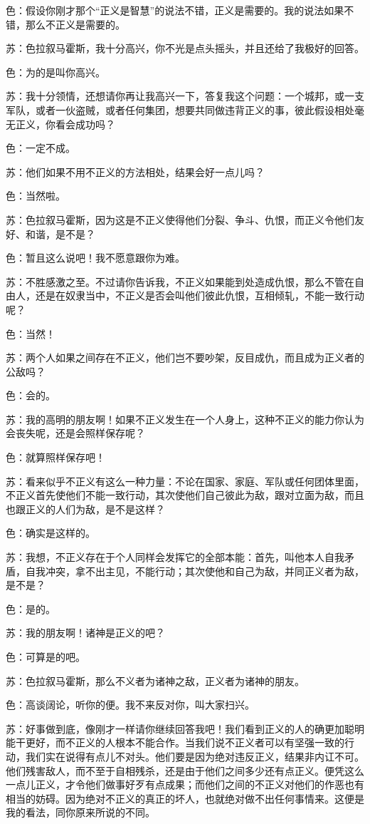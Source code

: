 \documentclass[11pt,oneside]{book}
\begin{document}
\begin{common-format}
色：假设你刚才那个“正义是智慧”的说法不错，正义是需要的。我的说法如果不错，那么不正义是需要的。

苏：色拉叙马霍斯，我十分高兴，你不光是点头摇头，并且还给了我极好的回答。

色：为的是叫你高兴。

苏：我十分领情，还想请你再让我高兴一下，答复我这个问题：一个城邦，或一支军队，或者一伙盗贼，或者任何集团，想要共同做违背正义的事，彼此假设相处毫无正义，你看会成功吗？

色：一定不成。

苏：他们如果不用不正义的方法相处，结果会好一点儿吗？

色：当然啦。

苏：色拉叙马霍斯，因为这是不正义使得他们分裂、争斗、仇恨，而正义令他们友好、和谐，是不是？

色：暂且这么说吧！我不愿意跟你为难。

苏：不胜感激之至。不过请你告诉我，不正义如果能到处造成仇恨，那么不管在自由人，还是在奴隶当中，不正义是否会叫他们彼此仇恨，互相倾轧，不能一致行动呢？

色：当然！

苏：两个人如果之间存在不正义，他们岂不要吵架，反目成仇，而且成为正义者的公敌吗？

色：会的。

苏：我的高明的朋友啊！如果不正义发生在一个人身上，这种不正义的能力你认为会丧失呢，还是会照样保存呢？

色：就算照样保存吧！

苏：看来似乎不正义有这么一种力量：不论在国家、家庭、军队或任何团体里面，不正义首先使他们不能一致行动，其次使他们自己彼此为敌，跟对立面为敌，而且也跟正义的人们为敌，是不是这样？

色：确实是这样的。

苏：我想，不正义存在于个人同样会发挥它的全部本能：首先，叫他本人自我矛盾，自我冲突，拿不出主见，不能行动；其次使他和自己为敌，并同正义者为敌，是不是？

色：是的。

苏：我的朋友啊！诸神是正义的吧？

色：可算是的吧。

苏：色拉叙马霍斯，那么不义者为诸神之敌，正义者为诸神的朋友。

色：高谈阔论，听你的便。我不来反对你，叫大家扫兴。

苏：好事做到底，像刚才一样请你继续回答我吧！我们看到正义的人的确更加聪明能干更好，而不正义的人根本不能合作。当我们说不正义者可以有坚强一致的行动，我们实在说得有点儿不对头。他们要是因为绝对违反正义，结果非内讧不可。他们残害敌人，而不至于自相残杀，还是由于他们之间多少还有点正义。便凭这么一点儿正义，才令他们做事好歹有点成果；而他们之间的不正义对他们的作恶也有相当的妨碍。因为绝对不正义的真正的坏人，也就绝对做不出任何事情来。这便是我的看法，同你原来所说的不同。


\end{common-format}
\end{document}
